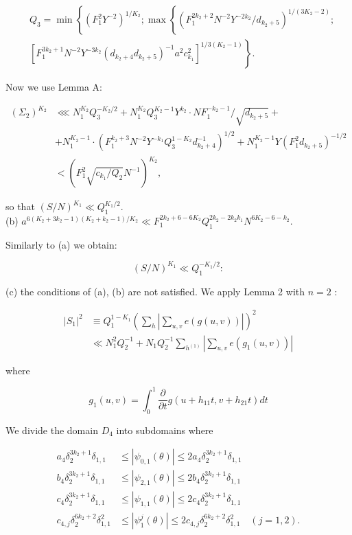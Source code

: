 \documentclass[10pt]{article}
\begin{document}
$$
\begin{aligned}
& Q_{3}=\min \left\{\left(F_{1}^{2} Y^{-2}\right)^{1 / K_{2}} ; \max \left\{\left(F_{1}^{2 k_{2}+2} N^{-2} Y^{-2 k_{2}} / d_{k_{2}+5}\right)^{1 /\left(3 K_{2}-2\right)} ;\right.\right. \\
& \left.\left[F_{1}^{3 k_{2}+1} N^{-2} Y^{-3 k_{2}}\left(d_{k_{2}+4} d_{k_{2}+5}\right)^{-1} a^{2} c_{k_{1}}^{2}\right]^{1 / 3\left(K_{2}-1\right)}\right\} .
\end{aligned}
$$

Now we use Lemma A:

$$
\begin{aligned}
\left(\Sigma_{2}\right)^{K_{2}} & \lll N_{1}^{K_{2}} Q_{3}^{-K_{2} / 2}+N_{1}^{K_{2}} Q_{3}^{K_{2}-1} Y^{k_{2}} \cdot N F_{1}^{-k_{2}-1} / \sqrt{d_{k_{2}+5}}+ \\
& +N_{1}^{K_{2}-1} \cdot\left(F_{1}^{k_{2}+3} N^{-2} Y^{-k_{1}} Q_{3}^{1-K_{2}} d_{k_{2}+4}^{-1}\right)^{1 / 2}+N_{1}^{K_{2}-1} Y\left(F_{1}^{2} d_{k_{2}+5}\right)^{-1 / 2} \\
& <\left(F_{1}^{2} \sqrt{c_{k_{1}} / Q_{2}} N^{-1}\right)^{K_{2}},
\end{aligned}
$$

so that $(S / N)^{K_{1}} \ll Q_{1}^{K_{1} / 2}$.\\
(b) $a^{6\left(K_{2}+3 k_{2}-1\right)\left(K_{2}+k_{2}-1\right) / K_{2}} \ll F_{1}^{2 k_{2}+6-6 K_{2}} Q_{1}^{2 k_{2}-2 k_{2} k_{1}} N^{6 K_{2}-6-k_{2}}$.

Similarly to (a) we obtain:

$$
(S / N)^{K_{1}} \ll Q_{1}^{-K_{1} / 2}:
$$

(c) the conditions of (a), (b) are not satisfied. We apply Lemma 2 with $n=2$ :

$$
\begin{aligned}
\left|S_{1}\right|^{2} & \equiv Q_{1}^{1-K_{1}}\left(\sum_{h}\left|\sum_{u, v} e(g(u, v))\right|\right)^{2} \\
& \ll N_{1}^{2} Q_{2}^{-1}+N_{1} Q_{2}^{-1} \sum_{h^{(1)}}\left|\sum_{u, v} e\left(g_{1}(u, v)\right)\right|
\end{aligned}
$$

where

$$
g_{1}(u, v)=\int_{0}^{1} \frac{\partial}{\partial t} g\left(u+h_{11} t, v+h_{21} t\right) d t
$$

We divide the domain $D_{4}$ into subdomains where

$$
\begin{aligned}
a_{4} \delta_{2}^{3 k_{2}+1} \delta_{1,1} & \leqslant\left|\psi_{0,1}(\theta)\right| \leqslant 2 a_{4} \delta_{2}^{3 k_{2}+1} \delta_{1,1} \\
b_{4} \delta_{2}^{3 k_{2}+1} \delta_{1,1} & \leqslant\left|\psi_{2,1}(\theta)\right| \leqslant 2 b_{4} \delta_{2}^{3 k_{2}+1} \delta_{1,1} \\
c_{4} \delta_{2}^{3 k_{2}+1} \delta_{1,1} & \leqslant\left|\psi_{1,1}(\theta)\right| \leqslant 2 c_{4} \delta_{2}^{3 k_{2}+1} \delta_{1,1} \\
c_{4, j} \delta_{2}^{6 k_{2}+2} \delta_{1,1}^{2} & \leqslant\left|\psi_{1}^{j}(\theta)\right| \leqslant 2 c_{4, j} \delta_{2}^{6 k_{2}+2} \delta_{1,1}^{2} \quad(j=1,2) .
\end{aligned}
$$
\end{document}
